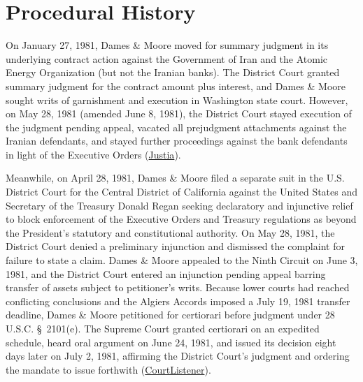 \documentclass[12pt]{article}
\begin{document}
\section{Procedural History}
On January 27, 1981, Dames \& Moore moved for summary judgment in its underlying contract action against the Government of Iran and the Atomic Energy Organization (but not the Iranian banks). The District Court granted summary judgment for the contract amount plus interest, and Dames \& Moore sought writs of garnishment and execution in Washington state court. However, on May 28, 1981 (amended June 8, 1981), the District Court stayed execution of the judgment pending appeal, vacated all prejudgment attachments against the Iranian defendants, and stayed further proceedings against the bank defendants in light of the Executive Orders (\href{https://supreme.justia.com/cases/federal/us/453/654/}{Justia}).

Meanwhile, on April 28, 1981, Dames \& Moore filed a separate suit in the U.S. District Court for the Central District of California against the United States and Secretary of the Treasury Donald Regan seeking declaratory and injunctive relief to block enforcement of the Executive Orders and Treasury regulations as beyond the President's statutory and constitutional authority. On May 28, 1981, the District Court denied a preliminary injunction and dismissed the complaint for failure to state a claim. Dames \& Moore appealed to the Ninth Circuit on June 3, 1981, and the District Court entered an injunction pending appeal barring transfer of assets subject to petitioner's writs. Because lower courts had reached conflicting conclusions and the Algiers Accords imposed a July 19, 1981 transfer deadline, Dames \& Moore petitioned for certiorari before judgment under 28 U.S.C. \S\ 2101(e). The Supreme Court granted certiorari on an expedited schedule, heard oral argument on June 24, 1981, and issued its decision eight days later on July 2, 1981, affirming the District Court's judgment and ordering the mandate to issue forthwith (\href{https://www.courtlistener.com/opinion/110564/dames-moore-v-regan/}{CourtListener}).
\end{document}
